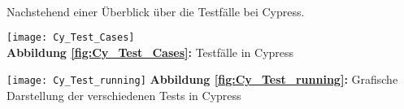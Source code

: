 \paragraph{}
Nachstehend einer Überblick über die Testfälle bei Cypress.
\\
\begin{center}
\texttt{[image: Cy\_Test\_Cases]}\label{fig:Cy_Test_Cases}\\
\textbf{Abbildung \autoref{fig:Cy_Test_Cases}:} Testfälle in Cypress
\end{center}

\begin{center}
\texttt{[image: Cy\_Test\_running]}\label{fig:Cy_Test_running}
\textbf{Abbildung \autoref{fig:Cy_Test_running}:} Grafische Darstellung der verschiedenen Tests in Cypress
\end{center}


